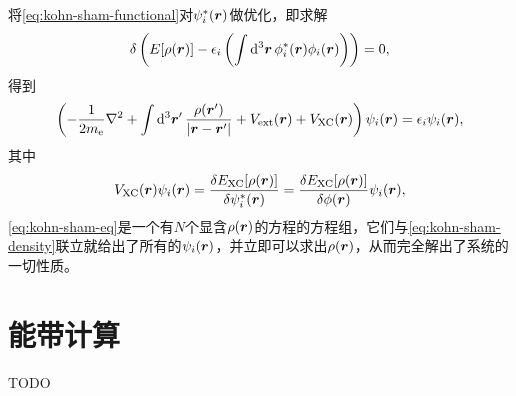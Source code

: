 \documentclass[hyperref, UTF8, a4paper]{ctexart}
\begin{document}
将\eqref{eq:kohn-sham-functional}对$\psi_i^*(\vb*{r})$做优化，即求解
\[
    \var \left( E[\rho(\vb*{r})] - \epsilon_i \left( \int \dd[3]{\vb*{r}} \phi_i^*(\vb*{r}) \phi_i(\vb*{r}) \right) \right) = 0,
\]
得到
\begin{equation}
    \left( - \frac{1}{2 m_\text{e}} \laplacian + \int \dd[3]{\vb*{r}'} \frac{\rho(\vb*{r}')}{\abs{\vb*{r} - \vb*{r}'}} + V_\text{ext}(\vb*{r}) + V_\text{XC}(\vb*{r}) \right) \psi_i(\vb*{r}) = \epsilon_i \psi_i(\vb*{r}),
    \label{eq:kohn-sham-eq}
\end{equation}
其中
\begin{equation}
    V_\text{XC}(\vb*{r}) \psi_i(\vb*{r}) = \fdv{E_\text{XC}[\rho(\vb*{r})]}{\psi^*_i(\vb*{r})} = \fdv{E_\text{XC}[\rho(\vb*{r})]}{\phi(\vb*{r})} \psi_i(\vb*{r}),
\end{equation}
\eqref{eq:kohn-sham-eq}是一个有$N$个显含$\rho(\vb*{r})$的方程的方程组，它们与\eqref{eq:kohn-sham-density}联立就给出了所有的$\psi_i(\vb*{r})$，并立即可以求出$\rho(\vb*{r})$，从而完全解出了系统的一切性质。

\section{能带计算}

TODO
\end{document}
